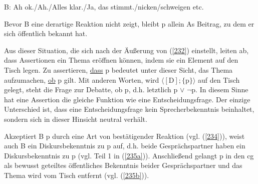 \begin{exe}
	\ex\label{234}
	B: Ah ok./Ah./Alles klar./Ja, das stimmt./nicken/schweigen etc.
\end{exe}
Bevor B eine derartige Reaktion nicht zeigt, bleibt p allein As Beitrag, zu dem er sich öffentlich bekannt hat.

Aus dieser Situation, die sich nach der Äußerung von (\ref{232}) einstellt, leiten \citet{Farkas2010} ab, dass Assertionen ein Thema eröffnen können, indem sie ein Element auf den Tisch legen. Zu  assertieren, \underline{dass} p bedeutet unter dieser Sicht, das Thema aufzumachen, \underline{ob} p gilt. Mit anderen Worten, wird $\langle[\textrm{D}]; \lbrace \textrm{p}\rbrace \rangle$ auf den Tisch gelegt, steht die Frage zur Debatte, ob p, d.h. letztlich p $\vee$ $\neg$p. In diesem Sinne hat eine Assertion die gleiche Funktion wie eine  Entscheidungsfrage. Der einzige Unterschied ist, dass eine Entscheidungsfrage kein Sprecherbekenntnis beinhaltet, sondern sich in dieser Hinsicht neutral verhält.

Akzeptiert B p durch eine Art von bestätigender Reaktion (vgl. (\ref{234})), weist auch B ein Diskursbekenntnis zu p auf, d.h. beide Gesprächspartner haben ein Diskursbekenntnis zu p (vgl. Teil 1 in (\ref{235a})). Anschließend gelangt p in den cg als bewusst geteiltes öffentliches Bekenntnis beider Gesprächspartner und das Thema wird vom Tisch entfernt (vgl. (\ref{235b})).

